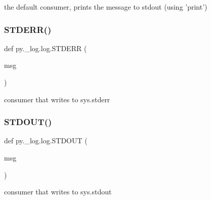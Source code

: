 \begin{DoxyVerb}the default consumer, prints the message to stdout (using 'print') \end{DoxyVerb}
 \mbox{\label{namespacepy_1_1__log_1_1log_a7519bc63315c0687184766ebfe36ab3d}} 
\subsubsection{\texorpdfstring{S\+T\+D\+E\+R\+R()}{STDERR()}}
{\footnotesize\ttfamily def py.\+\_\+log.\+log.\+S\+T\+D\+E\+RR (\begin{DoxyParamCaption}\item[{}]{msg }\end{DoxyParamCaption})}

\begin{DoxyVerb}consumer that writes to sys.stderr \end{DoxyVerb}
 \mbox{\label{namespacepy_1_1__log_1_1log_a6046f594a3d2b2ad0e7023ff5bfd72ea}} 
\subsubsection{\texorpdfstring{S\+T\+D\+O\+U\+T()}{STDOUT()}}
{\footnotesize\ttfamily def py.\+\_\+log.\+log.\+S\+T\+D\+O\+UT (\begin{DoxyParamCaption}\item[{}]{msg }\end{DoxyParamCaption})}

\begin{DoxyVerb}consumer that writes to sys.stdout \end{DoxyVerb}
 